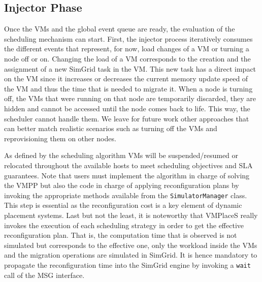 \documentclass[conference]{IEEEtran}
\newcommand{\sg}{SimGrid\xspace}
\newcommand{\vmps}{VMPlaceS\xspace}
\begin{document}
\subsection{Injector Phase}

Once the VMs and the global event queue are ready, the evaluation of
the scheduling mechanism can start. First, the injector process
iteratively consumes the different events that represent, for now,
load changes of a VM or turning a node off or on.  Changing the load
of a VM corresponds to the creation and the assignment of a new \sg
task in the VM. This new task has a direct impact on the VM since it
increases or decreases the current memory update speed of the VM and
thus the time that is needed to migrate it. 
When a node is turning off, the VMs that were running on that node are
temporarily discarded, \ie they are hidden and cannot be accessed
until the node comes back to life. This way, the scheduler cannot
handle them.   We leave for future work other approaches that can better
match realistic scenarios such as turning off the VMs and
reprovisioning them on other nodes.
%

As defined by the scheduling algorithm VMs will be suspended/resumed
or relocated throughout the available hosts to meet scheduling
objectives and SLA guarantees.  Note that users must implement the
algorithm in charge of solving the VMPP but also the code in charge of
applying reconfiguration plans by invoking the appropriate methods
available from the \texttt{SimulatorManager} class. This step is
essential as the reconfiguration cost is a key element of dynamic
placement systems.    Last but not the least, it is noteworthy
that \vmps really invokes the execution of each scheduling strategy in
order to get the effective reconfiguration plan.  That is, the
computation time that is observed is not simulated but corresponds to
the effective one, only the workload inside the VMs and the migration
operations are simulated in \sg. It is hence mandatory to propagate
the reconfiguration time into the \sg engine by invoking a
\texttt{wait} call of the MSG interface.
\end{document}
